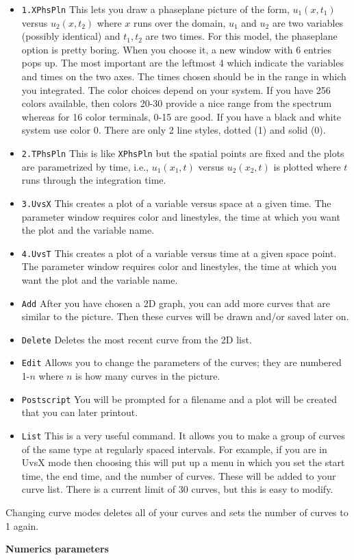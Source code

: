 \begin{itemize}
\item {\tt 1.XPhsPln} This lets you draw a phaseplane picture of the
form, $u_1(x,t_1)$ versus $u_2(x,t_2)$ where $x$ runs over the domain,
$u_1$ and $u_2$ are two variables (possibly identical) and $t_1,t_2$
are two times.  For this model, the phaseplane option is pretty
boring. When you choose it, a new window with 6 entries pops up.  The
most important are the leftmost 4 which indicate the variables and
times on the two axes.  The times chosen should be in the range in
which you integrated.  The color choices depend on your system.  If
you have 256 colors available, then colors 20-30 provide a nice range
from the spectrum whereas for 16 color terminals, 0-15 are good.  If
you have a black and white system use color 0.  There are only 2 line
styles, dotted (1) and solid (0). 
\item {\tt 2.TPhsPln} This is like {\tt XPhsPln} but the spatial points
are fixed and the plots are parametrized by time, i.e.,  $u_1(x_1,t)$
versus $u_2(x_2,t)$ is plotted where $t$ runs through the integration
time. 
\item {\tt 3.UvsX} This creates a plot of a variable versus space at a
given time.  The parameter window requires color and linestyles, the
time at which you want the plot and the variable name.  
\item {\tt 4.UvsT} This creates a plot of a variable versus time at a
given space point.  The parameter window requires color and linestyles, the
time at which you want the plot and the variable name.  
\item {\tt Add} After you have chosen a 2D graph, you can add more
curves that are similar to the picture.  Then these curves will be
drawn and/or saved later on.
\item {\tt Delete} Deletes the most recent curve from the 2D list.
\item {\tt Edit} Allows you to change the parameters of the curves;
they are numbered 1-$n$ where $n$ is how many curves in the picture.
\item {\tt Postscript} You will be prompted
for a filename and a plot will be created that you can later printout.
\item {\tt List}  This is a very useful command.  It allows you to
make a group of curves of the same type at regularly spaced intervals.
For example, if you are in UvsX mode then choosing this will put up a
menu in which you set the start time, the end time, and the number of
curves.  These will be added to your curve list.  There is a current
limit of 30 curves, but this is easy to modify.  
\end{itemize}
Changing curve modes deletes all of your curves and sets the number of
curves to 1 again.
\vspace{.25 in}
\begin{center}
{\bf \large Numerics parameters}
\end{center}

